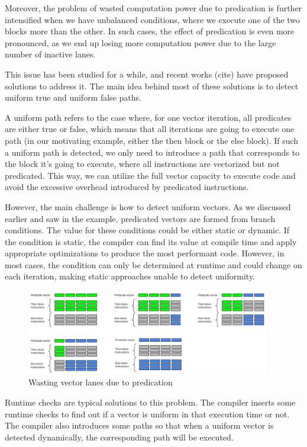 \documentclass[\main/thesis.tex]{subfiles}
\begin{document}
Moreover, the problem of wasted computation power due to predication is further intensified when we have unbalanced conditions, where we execute one of the two blocks more than the other. In such cases, the effect of predication is even more pronounced, as we end up losing more computation power due to the large number of inactive lanes.

This issue has been studied for a while, and recent works (cite) have proposed solutions to address it. The main idea behind most of these solutions is to detect uniform true and uniform false paths.

A uniform path refers to the case where, for one vector iteration, all predicates are either true or false, which means that all iterations are going to execute one path (in our motivating example, either the then block or the else block). If such a uniform path is detected, we only need to introduce a path that corresponds to the block it's going to execute, where all instructions are vectorized but not predicated. This way, we can utilize the full vector capacity to execute code and avoid the excessive overhead introduced by predicated instructions.

However, the main challenge is how to detect uniform vectors. As we discussed earlier and saw in the example, predicated vectors are formed from branch conditions. The value for these conditions could be either static or dynamic. If the condition is static, the compiler can find its value at compile time and apply appropriate optimizations to produce the most performant code. However, in most cases, the condition can only be determined at runtime and could change on each iteration, making static approaches unable to detect uniformity.

\begin{figure}[t!]
    \centering
    \includegraphics[width=0.95\textwidth]{img/condition_distribution.png}
    \caption{Wasting vector lanes due to predication}
    \label{fig:Permutation}
\end{figure}

Runtime checks are typical solutions to this problem. The compiler inserts some runtime checks to find out if a vector is uniform in that execution time or not. The compiler also introduces some paths so that when a uniform vector is detected dynamically, the corresponding path will be executed.
\end{document}
